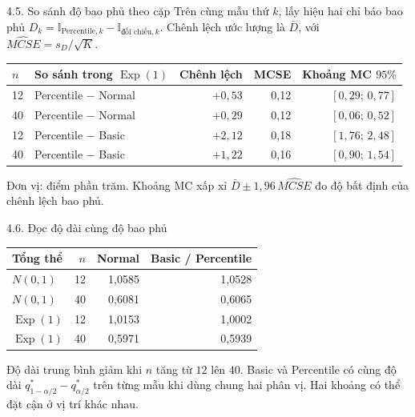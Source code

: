 \documentclass[aspectratio=43,10pt]{beamer}
\begin{document}
\begin{frame}{4.5. So sánh độ bao phủ theo cặp}
    \small
    Trên cùng mẫu thứ $k$, lấy hiệu hai chỉ báo bao phủ $D_k=\mathbb{I}_{\text{Percentile},k}-\mathbb{I}_{\text{đối chiếu},k}$.
    Chênh lệch ước lượng là $\bar D$, với $\widehat{MCSE}=s_D/\sqrt K$.
    \medskip

    \centering
    \begin{tabular}{llrrr}
    \toprule
    $n$ & So sánh trong $\operatorname{Exp}(1)$ & Chênh lệch & MCSE & Khoảng MC $95\%$\\
    \midrule
    12 & Percentile $-$ Normal & $+0{,}53$ & 0,12 & $[0{,}29;\,0{,}77]$\\
    40 & Percentile $-$ Normal & $+0{,}29$ & 0,12 & $[0{,}06;\,0{,}52]$\\
    12 & Percentile $-$ Basic  & $+2{,}12$ & 0,18 & $[1{,}76;\,2{,}48]$\\
    40 & Percentile $-$ Basic  & $+1{,}22$ & 0,16 & $[0{,}90;\,1{,}54]$\\
    \bottomrule
    \end{tabular}\par
    \medskip\raggedright
    Đơn vị: điểm phần trăm. Khoảng MC xấp xỉ $\bar D\pm1{,}96\,\widehat{MCSE}$ đo độ bất định của chênh lệch bao phủ.
\end{frame}

\begin{frame}{4.6. Đọc độ dài cùng độ bao phủ}
    \centering
    \begin{tabular}{lrrr}
    \toprule
    Tổng thể & $n$ & Normal & Basic / Percentile\\
    \midrule
    $N(0,1)$ & 12 & 1,0585 & 1,0528\\
    $N(0,1)$ & 40 & 0,6081 & 0,6065\\
    $\operatorname{Exp}(1)$ & 12 & 1,0153 & 1,0002\\
    $\operatorname{Exp}(1)$ & 40 & 0,5971 & 0,5939\\
    \bottomrule
    \end{tabular}\par
    \medskip\raggedright
    Độ dài trung bình giảm khi $n$ tăng từ $12$ lên $40$.
    Basic và Percentile có cùng độ dài $q_{1-\alpha/2}^*-q_{\alpha/2}^*$ trên từng mẫu khi dùng chung hai phân vị. Hai khoảng có thể đặt cận ở vị trí khác nhau.
\end{frame}
\end{document}
